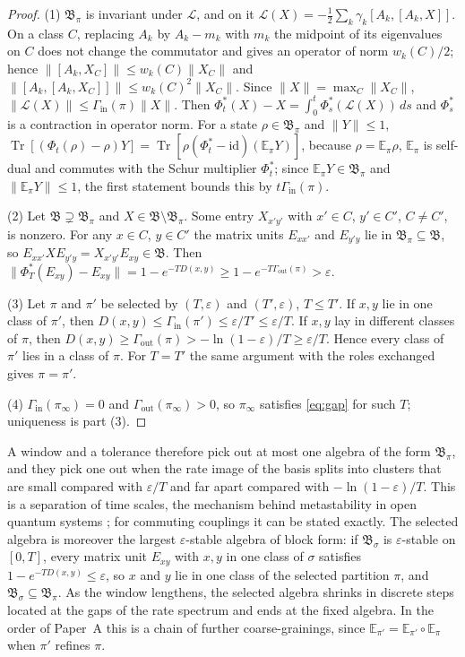 \documentclass[12pt,a4paper]{article}
\newcommand{\B}{\mathfrak B}
\newcommand{\E}{\mathbb E}
\newcommand{\Gin}{\Gamma_{\mathrm{in}}}
\newcommand{\Gout}{\Gamma_{\mathrm{out}}}
\newcommand{\Tr}{\operatorname{Tr}}
\begin{document}
\begin{proof}
(1) $\B_\pi$ is invariant under $\mathcal L$, and on it
$\mathcal L(X)=-\frac12\sum_k\gamma_k[A_k,[A_k,X]]$.
On a class $C$, replacing $A_k$ by $A_k-m_k$ with $m_k$ the midpoint of its eigenvalues on $C$ does not change the commutator and gives an operator of norm $w_k(C)/2$; hence $\|[A_k,X_C]\|\le w_k(C)\|X_C\|$ and $\|[A_k,[A_k,X_C]]\|\le w_k(C)^2\|X_C\|$. Since $\|X\|=\max_C\|X_C\|$, $\|\mathcal L(X)\|\le\Gin(\pi)\|X\|$. Then $\Phi_t^*(X)-X=\int_0^t\Phi_s^*(\mathcal L(X))\,ds$ and $\Phi_s^*$ is a contraction in operator norm. For a state $\rho\in\B_\pi$ and $\|Y\|\le1$, $\Tr[(\Phi_t(\rho)-\rho)Y]=\Tr[\rho(\Phi_t^*-\mathrm{id})(\E_\pi Y)]$, because $\rho=\E_\pi\rho$, $\E_\pi$ is self-dual and commutes with the Schur multiplier $\Phi_t^*$; since $\E_\pi Y\in\B_\pi$ and $\|\E_\pi Y\|\le1$, the first statement bounds this by $t\Gin(\pi)$.

(2) Let $\B\supsetneq\B_\pi$ and $X\in\B\setminus\B_\pi$. Some entry $X_{x'y'}$ with $x'\in C$, $y'\in C'$, $C\ne C'$, is nonzero. For any $x\in C$, $y\in C'$ the matrix units $E_{xx'}$ and $E_{y'y}$ lie in $\B_\pi\subseteq\B$, so $E_{xx'}XE_{y'y}=X_{x'y'}E_{xy}\in\B$. Then $\|\Phi_T^*(E_{xy})-E_{xy}\|=1-e^{-TD(x,y)}\ge1-e^{-T\Gout(\pi)}>\varepsilon$.

(3) Let $\pi$ and $\pi'$ be selected by $(T,\varepsilon)$ and $(T',\varepsilon)$, $T\le T'$. If $x,y$ lie in one class of $\pi'$, then $D(x,y)\le\Gin(\pi')\le\varepsilon/T'\le\varepsilon/T$. If $x,y$ lay in different classes of $\pi$, then $D(x,y)\ge\Gout(\pi)>-\ln(1-\varepsilon)/T\ge\varepsilon/T$. Hence every class of $\pi'$ lies in a class of $\pi$. For $T=T'$ the same argument with the roles exchanged gives $\pi=\pi'$.

(4) $\Gin(\pi_\infty)=0$ and $\Gout(\pi_\infty)>0$, so $\pi_\infty$ satisfies \eqref{eq:gap} for such $T$; uniqueness is part (3).
\end{proof}

A window and a tolerance therefore pick out at most one algebra of the form $\B_\pi$, and they pick one out when the rate image of the basis splits into clusters that are small compared with $\varepsilon/T$ and far apart compared with $-\ln(1-\varepsilon)/T$. This is a separation of time scales, the mechanism behind metastability in open quantum systems \cite{Macieszczak2016}; for commuting couplings it can be stated exactly. The selected algebra is moreover the largest $\varepsilon$-stable algebra of block form: if $\B_\sigma$ is $\varepsilon$-stable on $[0,T]$, every matrix unit $E_{xy}$ with $x,y$ in one class of $\sigma$ satisfies $1-e^{-TD(x,y)}\le\varepsilon$, so $x$ and $y$ lie in one class of the selected partition $\pi$, and $\B_\sigma\subseteq\B_\pi$. As the window lengthens, the selected algebra shrinks in discrete steps located at the gaps of the rate spectrum and ends at the fixed algebra. In the order of Paper~A this is a chain of further coarse-grainings, since $\E_{\pi'}=\E_{\pi'}\circ\E_\pi$ when $\pi'$ refines $\pi$.
\end{document}
